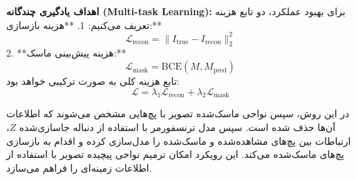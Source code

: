\textbf{اهداف یادگیری چندگانه (Multi-task Learning):}  
برای بهبود عملکرد، دو تابع هزینه تعریف می‌کنیم:
1. **هزینه بازسازی:**
\[
\mathcal{L}_{\text{recon}} = \|I_{\text{true}} - I_{\text{recon}}\|_2^2
\]
2. **هزینه پیش‌بینی ماسک:**
\[
\mathcal{L}_{\text{mask}} = \text{BCE}(M, M_{\text{pred}})
\]
تابع هزینه کلی به صورت ترکیبی خواهد بود:
\[
\mathcal{L} = \lambda_1 \mathcal{L}_{\text{recon}} + \lambda_2 \mathcal{L}_{\text{mask}}
\]




در این روش، سپس نواحی ماسک‌شده تصویر با پچ‌هایی مشخص می‌شوند که اطلاعات آن‌ها حذف شده است. سپس مدل ترنسفورمر با استفاده از دنباله جاسازی‌شده $Z$، ارتباطات بین پچ‌های مشاهده‌شده و ماسک‌شده را مدل‌سازی کرده و اقدام به بازسازی پچ‌های ماسک‌شده می‌کند. این رویکرد امکان ترمیم نواحی پیچیده تصویر با استفاده از اطلاعات زمینه‌ای را فراهم می‌سازد.


%
%
%
%
%


\warningToSelfUnfinished